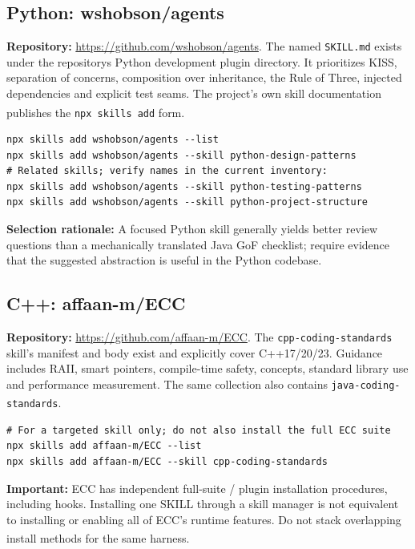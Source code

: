 \documentclass[11pt,letterpaper]{article}
\newcommand{\src}[1]{\textsuperscript{\textcolor{teal}{\cite{#1}}}}
\begin{document}
\subsection{Python: wshobson/agents}
\textbf{Repository:} \url{https://github.com/wshobson/agents}. The named \texttt{SKILL.md} exists under the repository\textquotesingle{}s Python development plugin directory. It prioritizes KISS, separation of concerns, composition over inheritance, the Rule of Three, injected dependencies and explicit test seams. The project's own skill documentation publishes the \texttt{npx skills add} form.\src{wshobson,wshobsonfile}
\begin{verbatim}
npx skills add wshobson/agents --list
npx skills add wshobson/agents --skill python-design-patterns
# Related skills; verify names in the current inventory:
npx skills add wshobson/agents --skill python-testing-patterns
npx skills add wshobson/agents --skill python-project-structure
\end{verbatim}
\textbf{Selection rationale:} A focused Python skill generally yields better review questions than a mechanically translated Java GoF checklist; require evidence that the suggested abstraction is useful in the Python codebase.

\subsection{C++: affaan-m/ECC}
\textbf{Repository:} \url{https://github.com/affaan-m/ECC}. The \texttt{cpp-coding-standards} skill's manifest and body exist and explicitly cover C++17/20/23. Guidance includes RAII, smart pointers, compile-time safety, concepts, standard library use and performance measurement. The same collection also contains \texttt{java-coding-standards}.\src{cppskill,javastandards}
\begin{verbatim}
# For a targeted skill only; do not also install the full ECC suite
npx skills add affaan-m/ECC --list
npx skills add affaan-m/ECC --skill cpp-coding-standards
\end{verbatim}
\textbf{Important:} ECC has independent full-suite / plugin installation procedures, including hooks. Installing one SKILL through a skill manager is not equivalent to installing or enabling all of ECC's runtime features. Do not stack overlapping install methods for the same harness.\src{ecc}
\end{document}

